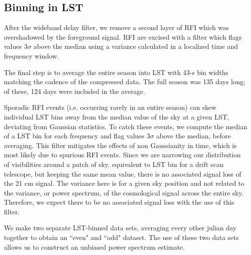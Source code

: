 \documentclass[twocolumn,numberedappendix]{emulateapj} \shorttitle{New Limits on the 21 cm Power Spectrum at $z=8.4$}
\begin{document}
\subsection{Binning in LST}\label{sec:lstbin}

After the wideband delay filter, we remove a second layer of RFI 
 which was overshadowed by the foreground signal. RFI are excised with a filter
which flags values $3\sigma$ above the median using a variance calculated in a
localized time and frequency window.  


The final step is to average the entire season into LST
with 43-s bin widths matching the cadence of
the compressed data. The full season was 135 days long; of these, 124
days were included in the average. 

Sporadic RFI events (i.e. occurring rarely in an entire season) can skew
individual LST bins away from the median value of the sky at a given LST,
deviating from Gaussian statistics. To catch these events, we compute the median
of a LST bin for each frequency and flag values 3$\sigma$ above the median,
before averaging. This filter mitigates the effects of non Gaussianity in time,
which is most likely due to spurious RFI events. Since we are narrowing our
distribution of visibilities around a patch of sky, equivalent to LST bin for a drift scan telescope, but keeping the
same mean value, there is no associated signal loss of the 21 cm signal. The
variance here is for a given sky position and not related to the variance, or
power spectrum, of the cosmological signal across the entire sky.
Therefore, we expect there to be no associated signal loss with the use of this
filter.

We make two separate LST-binned data sets, averaging every other julian day
together to obtain an ``even" and ``odd" dataset. The use of these two data sets
allows us to construct an unbiased power spectrum estimate.
\end{document}
